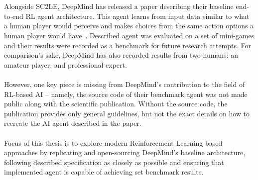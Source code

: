 \\\\
Alongside SC2LE, DeepMind has released a paper describing their baseline end-to-end RL agent architecture. This agent learns from input data similar to what a human player would perceive and makes choices from the same action options a human player would have~\cite{Vinyals2017}. Described agent was evaluated on a set of mini-games and their results were recorded as a benchmark for future research attempts. For comparison’s sake, DeepMind has also recorded results from two humans: an amateur player, and professional expert.
\\\\
However, one key piece is missing from DeepMind's contribution to the field of RL-based AI -- namely, the source code of their benchmark agent was not made public along with the scientific publication. Without the source code, the publication provides only general guidelines, but not the exact details on how to recreate the AI agent described in the paper.
\\\\
Focus of this thesis is to explore modern Reinforcement Learning based approaches by replicating and open-sourcing DeepMind’s baseline architecture, following described specification as closely as possible and ensuring that implemented agent is capable of achieving set benchmark results.